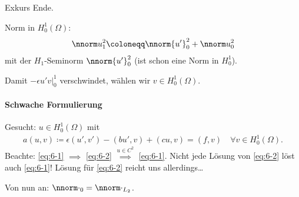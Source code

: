 Exkurs Ende. 

Norm in $H_{0}^{1}(\Omega)$:
\begin{align*}
  \nnorm u_{1}^{2} \coloneqq   \nnorm {u'}_{0}^{2} +   \nnorm u_{0}^{2}
\end{align*}
mit der $H_{1}$-Seminorm $  \nnorm {u'}_{0}^{2}$ (ist schon eine Norm in $H_{0}^{1}$). 

Damit  $- \epsilon u' v |_{0}^{1}$ verschwindet, wählen wir $v \in H_{0}^{1}(\Omega)$. 

\paragraph{Schwache Formulierung} Gesucht: $u \in H_{0}^{1}(\Omega)$ mit
\begin{align}\label{eq:6-2}
  a(u, v)\coloneqq \epsilon(u', v') - (bu', v) + (cu, v) = (f, v) \quad \forall v \in H_{0}^{1}(\Omega). 
\end{align}
Beachte: \eqref{eq:6-1} $\implies$ \eqref{eq:6-2} $\stackrel {u \in C^{2}} \implies$ \eqref{eq:6-1}. Nicht jede Lösung von \eqref{eq:6-2} löst auch \eqref{eq:6-1}! Lösung für \eqref{eq:6-2} reicht uns allerdings\dots

Von nun an: $\nnorm \cdot _{0} = \nnorm \cdot_{L_{2}}$. 

